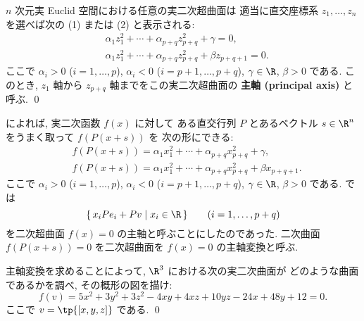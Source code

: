 \documentclass[12pt,twoside]{jarticle}
\begin{document}
\begin{cor}[実二次超曲面の主軸変換]
\label{cor:principal-axis}
  $n$ 次元実 Euclid 空間における任意の実二次超曲面は
  適当に直交座標系 $z_1,\dots,z_n$ を選べば次の (1) または (2) と表示される:
  \begin{align*}
    &
    \alpha_1 z_1^2 + \cdots + \alpha_{p+q} z_{p+q}^2 + \gamma = 0,
    \tag{1}
    \\ &
    \alpha_1 z_1^2 + \cdots + \alpha_{p+q} z_{p+q}^2 + \beta z_{p+q+1} = 0.
  \tag{2}
  \end{align*}
  ここで $\alpha_i>0$ ($i=1,\dots,p$), $\alpha_i<0$ ($i=p+1,\dots,p+q$), 
  $\gamma\in\R$, $\beta>0$ である.
  このとき, $z_1$ 軸から $z_{p+q}$ 軸までをこの実二次超曲面の
  {\bf 主軸 (principal axis)} と呼ぶ.
  \qed
\end{cor}


によれば, 実二次函数 $f(x)$ に対して
ある直交行列 $P$ とあるベクトル $s\in\R^n$ をうまく取って $f(P(x+s))$ を
次の形にできる:
\begin{align*}
  &
  f(P(x+s)) 
  = \alpha_1 x_1^2 + \cdots + \alpha_{p+q} x_{p+q}^2 + \gamma,
  \tag{1}
  \\ &
  f(P(x+s)) 
  = \alpha_1 x_1^2 + \cdots + \alpha_{p+q} x_{p+q}^2 + \beta x_{p+q+1}.
  \tag{2}
\end{align*}
ここで $\alpha_i>0$ ($i=1,\dots,p$), $\alpha_i<0$ ($i=p+1,\dots,p+q$), 
$\gamma\in\R$, $\beta>0$ である.
では
\begin{equation*}
  \{\, x_iPe_i + Pv \mid x_i \in \R \,\}
  \qquad
  (i=1,\dots,p+q)
\end{equation*}
を二次超曲面 $f(x)=0$ の主軸と呼ぶことにしたのであった.
二次曲面 $f(P(x+s))=0$ を二次超曲面を $f(x)=0$ の主軸変換と呼ぶ.


\begin{question}
\label{q:arq-1}
  主軸変換を求めることによって, $\R^3$ における次の実二次曲面が
  どのような曲面であるかを調べ, その概形の図を描け:
  \begin{equation*}
    f(v) =  5x^2 + 3y^2 + 3z^2 - 4xy + 4xz + 10yz - 24x + 48y + 12 = 0.
  \end{equation*}
  ここで $v=\tp{[x,y,z]}$ である. \qed
\end{question}
\end{document}
